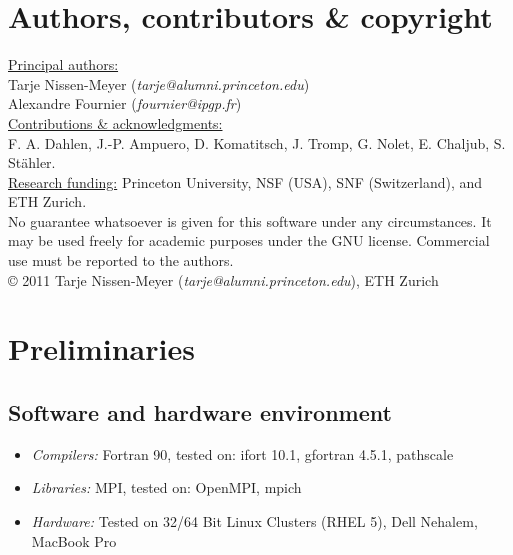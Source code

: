 \documentclass[11pt,letter,fleqn,english,notitlepage]{article}
\begin{document}
\section{Authors, contributors \& copyright}

\underline{Principal authors:}
\vspace*{0.2cm}\\
Tarje Nissen-Meyer (\textit{tarje@alumni.princeton.edu})\\
Alexandre Fournier (\textit{fournier@ipgp.fr})\\

\noindent \underline{Contributions \& acknowledgments:}
\vspace*{0.2cm}\\
F. A. Dahlen, J.-P. Ampuero, D. Komatitsch, J. Tromp, G. Nolet, E. Chaljub, S. St\"{a}hler.\\

\noindent \underline{Research funding:} Princeton University, NSF (USA), SNF (Switzerland), and 
ETH Zurich.\\

\noindent No guarantee whatsoever is given for this software under any circumstances. It may be used freely for 
academic purposes under the GNU license. Commercial use must be reported to the authors.\\

\noindent \copyright  \hspace*{0.1cm} 
2011 Tarje Nissen-Meyer (\textit{tarje@alumni.princeton.edu}), ETH Zurich

\newpage
\tableofcontents
\newpage

\section{Preliminaries}

\subsection{Software and hardware environment}
\begin{itemize}
\item \textit{Compilers:} Fortran 90, tested on: ifort 10.1, gfortran 4.5.1, pathscale
\item \textit{Libraries:} MPI, tested on:  OpenMPI, mpich
\item \textit{Hardware:} Tested on 32/64 Bit Linux Clusters (RHEL 5), Dell Nehalem, MacBook Pro
\end{itemize}
\end{document}
